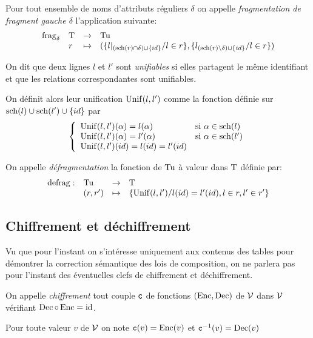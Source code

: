 \begin{defi}
	Pour tout ensemble de noms d'attributs réguliers $\delta$
	on appelle \emph{fragmentation de fragment gauche $\delta$}
	l'application suivante:
	$$
	\begin{array}{llcl}
	\operatorname{frag}_{\delta} 	& \operatorname{T} & \rightarrow & \operatorname{Tu} \\
				& r  & \mapsto & (\{l|_{(\operatorname{sch}(r)\cap \delta) \cup \{id\}}/ l \in r \}, 
						\{ l_{(\operatorname{sch}(r) \setminus \delta)\cup \{id\}} / l \in r \})
	\end{array}
	$$
\end{defi}

\begin{defi}
	On dit que deux lignes $l$ et $l'$ sont \emph{unifiables}
	si elles partagent le même identifiant
	et que les relations correspondantes sont unifiables.
	
	On définit alors leur unification $\operatorname{Unif}(l, l')$ comme la fonction
	définie sur $\operatorname{sch}(l) \cup \operatorname{sch}(l') \cup \{id\}$ par
		$$
		\left\lbrace
		\begin{array}{ll}
		\operatorname{Unif}(l, l')(\alpha)  = l(\alpha) & \text{si $\alpha \in \operatorname{sch}(l) $} \\
		\operatorname{Unif}(l, l')(\alpha)  = l'(\alpha) & \text{si $\alpha \in \operatorname{sch}(l') $} \\
		\operatorname{Unif}(l, l')(id)  = l(id) = l'(id) &  \\
		\end{array}
		\right.
		$$
\end{defi}

\begin{defi}
	On appelle \emph{défragmentation} la fonction
	de $\operatorname{Tu}$ à valeur dans $\operatorname{T}$ définie par:
	$$
	\begin{array}{llcl}
	\operatorname{defrag}: & \operatorname{Tu} & \rightarrow & \operatorname{T} \\
			& (r, r') & \mapsto & \{ \operatorname{Unif}(l, l') / l(id) = l'(id), l\in r, l' \in r' \}
	\end{array}
	$$
\end{defi}

\subsection*{Chiffrement et déchiffrement}
Vu que pour l'instant on s'intéresse uniquement aux contenus des 
tables pour démontrer la correction sémantique des lois
de composition, on ne parlera pas pour l'instant
des éventuelles clefs de chiffrement et déchiffrement.

\begin{defi}
	On appelle \emph{chiffrement} tout couple $\text{\ttfamily c}$ de fonctions $(\operatorname{Enc}, \operatorname{Dec})$
	de $\mathcal{V}$ dans $\mathcal{V}$
	vérifiant
	$\displaystyle \operatorname{Dec} \circ \operatorname{Enc} = \operatorname{id}$.
	
	Pour toute valeur $v$ de $\mathcal{V}$
	on note $\text{\ttfamily c}(v) = \operatorname{Enc}(v)$
	et $\text{\ttfamily c}^{-1}(v) = \operatorname{Dec}(v)$
\end{defi}

